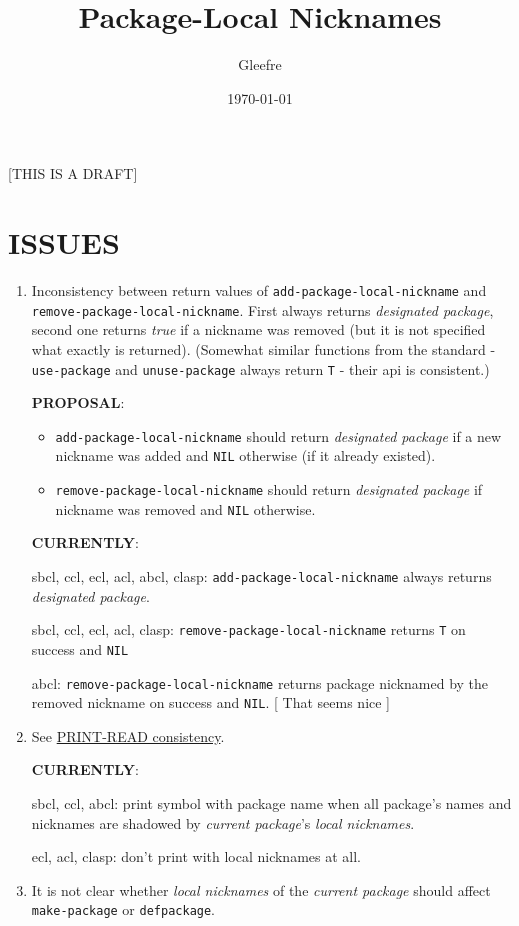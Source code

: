 \documentclass[11pt]{article}
\author{Gleefre}
\date{\today}
\title{Package-Local Nicknames}
\begin{document}
\maketitle
\tableofcontents

[THIS IS A DRAFT]

\section{ISSUES}
\label{sec:orgeeb4508}
\begin{enumerate}
\item Inconsistency between return values of \texttt{add-package-local-nickname} and
\texttt{remove-package-local-nickname}. First always returns \emph{designated package},
second one returns \emph{true} if a nickname was removed (but it is not
specified what exactly is returned). (Somewhat similar functions from the
standard - \texttt{use-package} and \texttt{unuse-package} always return \texttt{T} - their api
is consistent.)

\textbf{PROPOSAL}:
\begin{itemize}
\item \texttt{add-package-local-nickname} should return \emph{designated package} if a new
nickname was added and \texttt{NIL} otherwise (if it already existed).
\item \texttt{remove-package-local-nickname} should return \emph{designated package} if
nickname was removed and \texttt{NIL} otherwise.
\end{itemize}

\textbf{CURRENTLY}:

sbcl, ccl, ecl, acl, abcl, clasp: \texttt{add-package-local-nickname} always returns
\emph{designated package}.

sbcl, ccl, ecl, acl, clasp: \texttt{remove-package-local-nickname} returns \texttt{T} on success
and \texttt{NIL}

abcl: \texttt{remove-package-local-nickname} returns package nicknamed by the
removed nickname on success and \texttt{NIL}.  [ That seems nice ]
\item See \hyperref[sec:org1748ec5]{PRINT-READ consistency}.

\textbf{CURRENTLY}:

sbcl, ccl, abcl: print symbol with package name when all package's names
and nicknames are shadowed by \emph{current package}'s \emph{local nicknames}.

ecl, acl, clasp: don't print with local nicknames at all.
\item It is not clear whether \emph{local nicknames} of the \emph{current package} should
affect \texttt{make-package} or \texttt{defpackage}.


\end{enumerate}
\end{document}
